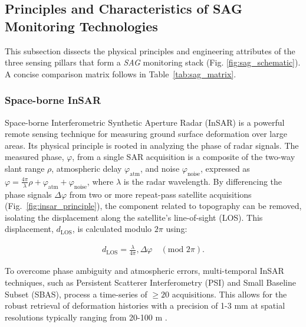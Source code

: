 \documentclass[preprint,11pt,authoryear,3p]{elsarticle}
\begin{document}
\subsection{Principles and Characteristics of SAG Monitoring Technologies}\label{subsec:tech_principles}

This subsection dissects the physical principles and engineering attributes of the three sensing pillars that form a
\emph{SAG} monitoring stack (Fig. \ref{fig:sag_schematic}). A concise comparison matrix follows in Table~\ref{tab:sag_matrix}.


\subsubsection{Space-borne InSAR}

Space-borne Interferometric Synthetic Aperture Radar (InSAR) is a powerful remote sensing technique for measuring ground surface deformation over large areas. Its physical principle is rooted in analyzing the phase of radar signals. The measured phase, $\varphi$, from a single SAR acquisition is a composite of the two-way slant range $\rho$, atmospheric delay $\varphi_{\text{atm}}$, and noise $\varphi_{\text{noise}}$, expressed as $\varphi = \tfrac{4\pi}{\lambda}\rho + \varphi_{\text{atm}} + \varphi_{\text{noise}}$, where $\lambda$ is the radar wavelength. By differencing the phase signals $\Delta\varphi$ from two or more repeat-pass satellite acquisitions (Fig.~\ref{fig:insar_principle}), the component related to topography can be removed, isolating the displacement along the satellite's line-of-sight (LOS). This displacement, $d_{\mathrm{LOS}}$, is calculated modulo $2\pi$ using:

\begin{align}
  d_{\mathrm{LOS}} = \frac{\lambda}{4\pi},\Delta\varphi
  \quad (\text{mod } 2\pi).
  \label{eq:insar}
\end{align}

To overcome phase ambiguity and atmospheric errors, multi-temporal InSAR techniques, such as Persistent Scatterer Interferometry (PSI) and Small Baseline Subset (SBAS), process a time-series of $\ge 20$ acquisitions. This allows for the robust retrieval of deformation histories with a precision of 1-3 mm at spatial resolutions typically ranging from 20-100 m \citep{Ferretti2014}.
\end{document}
